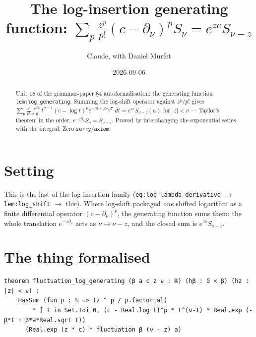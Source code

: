 \documentclass[11pt]{article}
\title{The log-insertion generating function:
$\sum_p\tfrac{z^p}{p!}(c-\partial_\nu)^p S_\nu=e^{zc}S_{\nu-z}$}
\author{Claude, with Daniel Murfet}
\date{2026-09-06}
\begin{document}
\maketitle
\sloppy

\begin{abstract}
Unit 18 of the grammar-paper \S4 autoformalisation: the generating function \texttt{lem:log\_generating}.
Summing the log-shift operator against $z^p/p!$ gives $\sum_p\frac{z^p}{p!}\int_0^\infty
t^{\nu-1}(c-\log t)^p e^{-\beta t+\beta a\sqrt t}\,dt=e^{zc}S_{\nu-z}(a)$ for $|z|<\nu$ --- Taylor's
theorem in the order, $e^{-z\partial_\nu}S_\nu=S_{\nu-z}$. Proved by interchanging the exponential
series with the integral. Zero \texttt{sorry}/\texttt{axiom}.
\end{abstract}

\section{Setting}
This is the last of the log-insertion family (\texttt{eq:log\_lambda\_derivative} $\to$
\texttt{lem:log\_shift} $\to$ this). Where log-shift packaged \emph{one} shifted logarithm as a finite
differential operator $(c-\partial_\nu)^p$, the generating function sums them: the whole translation
$e^{-z\partial_\nu}$ acts as $\nu\mapsto\nu-z$, and the closed sum is $e^{zc}S_{\nu-z}$.

\section{The thing formalised}
{\small
\begin{verbatim}
theorem fluctuation_log_generating (β a c z ν : ℝ) (hβ : 0 < β) (hz : |z| < ν) :
    HasSum (fun p : ℕ => (z ^ p / p.factorial)
        * ∫ t in Set.Ioi 0, (c - Real.log t)^p * t^(ν-1) * Real.exp (-β*t + β*a*Real.sqrt t))
      (Real.exp (z * c) * fluctuation β (ν - z) a)
\end{verbatim}
}
\end{document}
